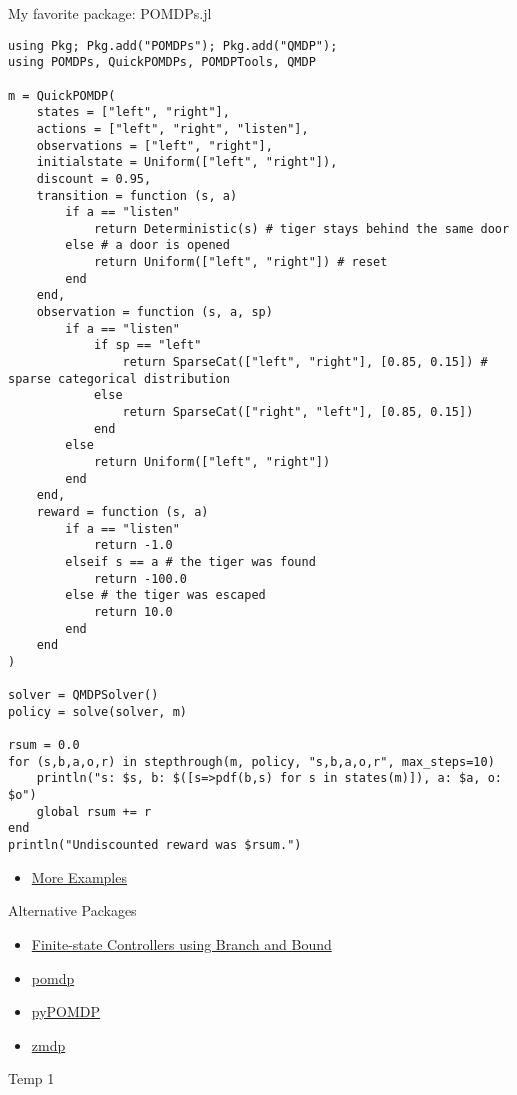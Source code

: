 \documentclass[presentation, smaller]{beamer}
\begin{document}
\begin{frame}[label={sec:org3ef719a},fragile]{My favorite package: POMDPs.jl}
 \begin{verbatim}
using Pkg; Pkg.add("POMDPs"); Pkg.add("QMDP");
using POMDPs, QuickPOMDPs, POMDPTools, QMDP

m = QuickPOMDP(
    states = ["left", "right"],
    actions = ["left", "right", "listen"],
    observations = ["left", "right"],
    initialstate = Uniform(["left", "right"]),
    discount = 0.95,
    transition = function (s, a)
        if a == "listen"
            return Deterministic(s) # tiger stays behind the same door
        else # a door is opened
            return Uniform(["left", "right"]) # reset
        end
    end,
    observation = function (s, a, sp)
        if a == "listen"
            if sp == "left"
                return SparseCat(["left", "right"], [0.85, 0.15]) # sparse categorical distribution
            else
                return SparseCat(["right", "left"], [0.85, 0.15])
            end
        else
            return Uniform(["left", "right"])
        end
    end,
    reward = function (s, a)
        if a == "listen"
            return -1.0
        elseif s == a # the tiger was found
            return -100.0
        else # the tiger was escaped
            return 10.0
        end
    end
)

solver = QMDPSolver()
policy = solve(solver, m)

rsum = 0.0
for (s,b,a,o,r) in stepthrough(m, policy, "s,b,a,o,r", max_steps=10)
    println("s: $s, b: $([s=>pdf(b,s) for s in states(m)]), a: $a, o: $o")
    global rsum += r
end
println("Undiscounted reward was $rsum.")
\end{verbatim}

\begin{itemize}
\item \href{https://github.com/JuliaPOMDP/POMDPGallery.jl}{More Examples}
\end{itemize}
\end{frame}

\begin{frame}[label={sec:org401406d}]{Alternative Packages}
\begin{itemize}
\item \href{https://www.cs.kent.ac.uk/people/staff/mg483/code/IsoFreeBB/}{Finite-state Controllers using Branch and Bound}
\item \href{https://github.com/mhahsler/pomdp}{pomdp}
\item \href{https://bitbucket.org/bami/pypomdp}{pyPOMDP}
\item \href{https://longhorizon.org/trey/zmdp/}{zmdp}
\end{itemize}
\end{frame}
\begin{frame}[label={sec:org91dcf76}]{Temp 1}
\end{frame}
\end{document}
